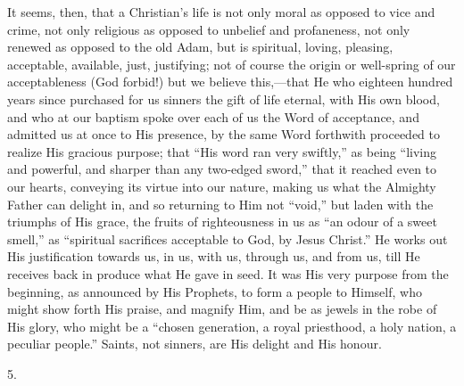 It seems, then, that a Christian's life is not only moral as
opposed to vice and crime, not only religious as opposed to unbelief
and profaneness, not only renewed as opposed to the old Adam, but is
spiritual, loving, pleasing, acceptable, available, just, justifying;
not of course the origin or well-spring of our acceptableness (God
forbid!) but we believe this,—that He who eighteen hundred years
since purchased for us sinners the gift of life eternal, with His own
blood, and who at our baptism spoke over each of us the Word of
acceptance, and admitted us at once to His presence, by the same Word
forthwith proceeded to realize His gracious purpose; that ``His
word ran very swiftly,'' as being ``living and powerful, and
sharper than any two-edged sword,'' that it reached even to our
hearts, conveying its virtue into our nature, making us what the
Almighty Father can delight in, and so returning to Him not
``void,'' but laden with the triumphs of His grace, the fruits
of righteousness in us as ``an odour of a sweet smell,'' as
``spiritual sacrifices acceptable to God, by Jesus Christ.''
He works out His justification towards us, in us, with us, through us, and from us, till He receives back in produce what He gave
in seed. It was His very purpose from the beginning, as announced by
His Prophets, to form a people to Himself, who might show forth His
praise, and magnify Him, and be as jewels in the robe of His glory,
who might be a ``chosen generation, a royal priesthood, a holy
nation, a peculiar people.'' Saints, not sinners, are His delight
and His honour.

5.

